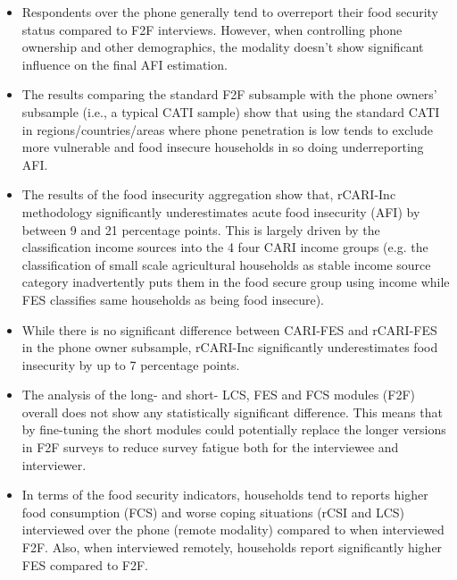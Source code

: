 \documentclass[11pt,harvard]{article}
\begin{document}
	\begin{itemize}[left=2.5em]
		\item Respondents over the phone generally tend to overreport their food security status compared to F2F interviews. However, when controlling phone ownership and other demographics, the modality doesn’t show significant influence on the final AFI estimation.
		\item 	The results comparing the standard F2F subsample with the phone owners’ subsample (i.e., a typical CATI sample) show that using the standard CATI in regions/countries/areas where phone penetration is low tends to exclude more vulnerable and food insecure households in so doing underreporting AFI.
		\item The results of the food insecurity aggregation show that, rCARI-Inc methodology significantly underestimates acute food insecurity (AFI) by between 9 and 21 percentage points. This is largely driven by the classification  income sources into the 4 four CARI income groups (e.g. the classification of small scale agricultural households as stable income source category inadvertently puts them in the food secure group  using income while FES classifies same households as being food insecure).
		\item While there is no significant difference between CARI-FES and rCARI-FES in the phone owner subsample, rCARI-Inc significantly underestimates food insecurity by up to 7 percentage points.
		\item The analysis of the long- and short- LCS, FES and FCS modules (F2F) overall does not show any statistically significant difference. This means that by fine-tuning the short modules could potentially replace the longer versions in F2F surveys to reduce survey fatigue both for the interviewee and interviewer.
		\item In terms of the food security indicators,  households tend to  reports higher food consumption (FCS) and worse coping situations (rCSI and LCS)  interviewed over the phone (remote modality) compared to when interviewed F2F. Also, when interviewed remotely, households report significantly higher FES compared to F2F. 
		
		
	\end{itemize}
	
	
	\pagebreak
	
	
\end{document}
